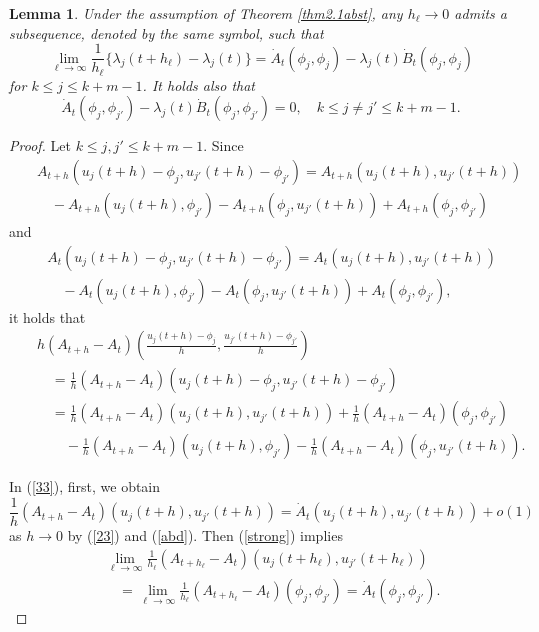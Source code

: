 \documentclass[final,a4paper]{jmsj}
\theoremstyle{thmstyleone}%
\theoremstyle{thmstyletwo}%
\theoremstyle{thmstylethree}%
\newtheorem{lemma}[theorem]{Lemma}
\begin{document}
\begin{lemma}\label{lem4}
Under the assumption of Theorem \ref{thm2.1abst}, any $h_\ell\rightarrow 0$ admits a subsequence, denoted by the same symbol, such that  
\begin{equation} 
\lim_{\ell\rightarrow\infty}\frac{1}{h_\ell}\{ \lambda_j(t+h_\ell)-\lambda_j(t)\} =\dot A_{t}(\phi_j, \phi_j)-\lambda_j(t)\dot B_{t}(\phi_j, \phi_j)
 \label{wakewake}
\end{equation} 
for $k\leq j\leq k+m-1$. It holds also that 
\begin{equation} 
\dot A_{t}(\phi_j, \phi_{j'})-\lambda_j(t)\dot B_{t}(\phi_j, \phi_{j'})=0, \quad k\leq j\neq j'\leq k+m-1. 
 \label{jj}
\end{equation} 
\end{lemma} 

\begin{proof} 
Let $k\leq j, j'\leq k+m-1$. Since 
\begin{eqnarray*} 
& & A_{t+h}(u_j(t+h)-\phi_j, u_{j'}(t+h)-\phi_{j'}) = A_{t+h}(u_j(t+h), u_{j'}(t+h)) \\ 
& & \quad -A_{t+h}(u_j(t+h), \phi_{j'}) -A_{t+h}(\phi_j, u_{j'}(t+h))+A_{t+h}(\phi_j, \phi_{j'}) 
\end{eqnarray*} 
and 
\begin{eqnarray*} 
& & A_{t}(u_j(t+h)-\phi_j, u_{j'}(t+h)-\phi_{j'})=A_{t}(u_j(t+h), u_{j'}(t+h)) \\ 
& & \quad -A_{t}(u_j(t+h), \phi_{j'})-A_{t}(\phi_j, u_{j'}(t+h))+A_{t}(\phi_j,\phi_{j'}), 
\end{eqnarray*} 
it holds that  
\begin{eqnarray} 
& & h(A_{t+h}-A_{t})(\frac{u_j(t+h)-\phi_j}{h}, \frac{u_{j'}(t+h)-\phi_{j'}}{h}) \nonumber\\
& & \quad =\frac{1}{h}(A_{t+h}-A_{t})(u_j(t+h)-\phi_j, u_{j'}(t+h)-\phi_{j'}) \nonumber\\ 
& & \quad = \frac{1}{h}(A_{t+h}-A_{t})(u_j(t+h), u_{j'}(t+h)) 
+\frac{1}{h}(A_{t+h}-A_{t})(\phi_j, \phi_{j'}) \nonumber\\ 
& & \qquad -\frac{1}{h}(A_{t+h}-A_t)(u_j(t+h), \phi_{j'})-\frac{1}{h}(A_{t+h}-A_t)(\phi_j, u_{j'}(t+h)).  
 \label{33}
\end{eqnarray} 

In (\ref{33}), first, we obtain  
\[ 
\frac{1}{h}(A_{t+h}-A_{t})(u_j(t+h), u_{j'}(t+h))=\dot A_{t}(u_j(t+h),u_{j'}(t+h))+o(1) \] 
as $h\rightarrow 0$ by (\ref{23}) and (\ref{abd}). Then (\ref{strong}) implies 
\begin{eqnarray} 
& & \lim_{\ell\rightarrow\infty}\frac{1}{h_\ell}(A_{t+h_\ell}-A_{t})(u_j(t+h_\ell), u_{j'}(t+h_\ell)) \nonumber\\ 
& & \quad = \lim_{\ell\rightarrow\infty}\frac{1}{h_\ell}(A_{t+h_\ell}-A_{t})(\phi_j, \phi_{j'})
= \dot A_{t}(\phi_j, \phi_{j'}). 
 \label{35}
\end{eqnarray} 


\end{proof}
\end{document}
